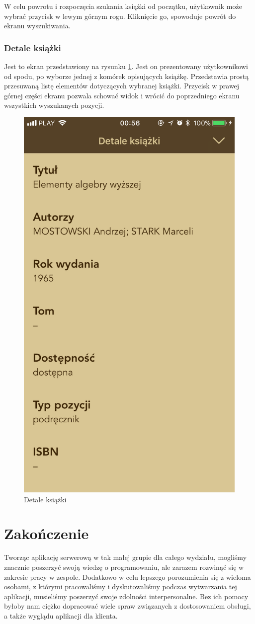 \documentclass[twoside]{projektInzynierskiMS}
\begin{document}
W celu powrotu i rozpoczęcia szukania książki od początku, użytkownik może wybrać przycisk w lewym górnym rogu. Kliknięcie go, spowoduje powrót do ekranu wyszukiwania.

\subsubsection{Detale książki}

Jest to ekran przedstawiony na rysunku \ref{fig:bookDetails}. Jest on prezentowany użytkownikowi od spodu, po wyborze jednej z komórek opisujących książkę. Przedstawia prostą przesuwaną listę elementów dotyczących wybranej książki. Przycisk w prawej górnej części ekranu pozwala schować widok i wrócić do poprzedniego ekranu wszystkich wyszukanych pozycji.

\begin{figure}[h]
  \centering
  \includegraphics[width=0.4\linewidth]{img/ios8.PNG}
  \caption{Detale książki}
  \label{fig:bookDetails}
\end{figure}


\section{Zakończenie}

Tworząc aplikację serwerową w tak małej grupie dla całego wydziału, mogliśmy znacznie poszerzyć swoją wiedzę o programowaniu, ale zarazem rozwinąć się w zakresie pracy w zespole. Dodatkowo w celu lepszego porozumienia się z wieloma osobami, z którymi pracowaliśmy i dyskutowaliśmy podczas wytwarzania tej aplikacji, musieliśmy poszerzyć swoje zdolności interpersonalne. Bez ich pomocy byłoby nam ciężko dopracować wiele spraw związanych z dostosowaniem obsługi, a także wyglądu aplikacji dla klienta.
\end{document}
